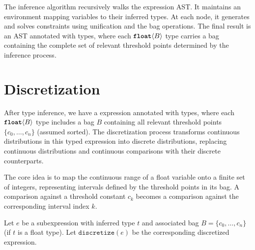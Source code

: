 \documentclass[acmsmall,screen,dvipsnames,x11names,nonacm,anonymous,review]{acmart}
\newcommand{\float}{\text{\ttfamily\bfseries float}}
\newcommand{\CDice}{\text{\scshape CDice}\xspace}
\begin{document}
The inference algorithm recursively walks the expression AST. It maintains an environment mapping variables to their inferred types. At each node, it generates and solves constraints using unification and the bag operations. The final result is an AST annotated with types, where each $\float\langle B \rangle$ type carries a bag containing the complete set of relevant threshold points determined by the inference process.

\section{Discretization}

After type inference, we have a \CDice expression annotated with types, where each $\float\langle B \rangle$ type includes a bag $B$ containing all relevant threshold points $\{c_0, \dots, c_n\}$ (assumed sorted). The discretization process transforms continuous distributions in this typed expression into discrete distributions, replacing continuous distributions and continuous comparisons with their discrete counterparts.

The core idea is to map the continuous range of a float variable onto a finite set of integers, representing intervals defined by the threshold points in its bag. A comparison against a threshold constant $c_k$ becomes a comparison against the corresponding interval index $k$.

Let $e$ be a subexpression with inferred type $t$ and associated bag $B = \{c_0, \dots, c_n\}$ (if $t$ is a float type). Let $\texttt{discretize}(e)$ be the corresponding discretized expression.
\end{document}

